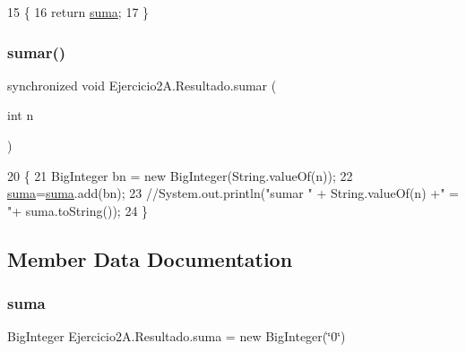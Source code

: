 \begin{DoxyCode}
15     \{
16         \textcolor{keywordflow}{return} \mbox{\hyperlink{class_ejercicio2_a_1_1_resultado_ad684a9a7e4f55ef6862c6d1234259866}{suma}};
17     \}
\end{DoxyCode}
\mbox{\label{class_ejercicio2_a_1_1_resultado_a72ea26b269e45dcf10697761fd351d76}} 
\subsubsection{\texorpdfstring{sumar()}{sumar()}}
{\footnotesize\ttfamily synchronized void Ejercicio2\+A.\+Resultado.\+sumar (\begin{DoxyParamCaption}\item[{int}]{n }\end{DoxyParamCaption})\hspace{0.3cm}{\ttfamily [inline]}}


\begin{DoxyCode}
20     \{
21         BigInteger bn = \textcolor{keyword}{new} BigInteger(String.valueOf(n));
22         \mbox{\hyperlink{namespacesuma}{suma}}=\mbox{\hyperlink{namespacesuma}{suma}}.add(bn);
23         \textcolor{comment}{//System.out.println("sumar " + String.valueOf(n) +" = "+ suma.toString());}
24     \}
\end{DoxyCode}


\subsection{Member Data Documentation}
\mbox{\label{class_ejercicio2_a_1_1_resultado_ad684a9a7e4f55ef6862c6d1234259866}} 
\subsubsection{\texorpdfstring{suma}{suma}}
{\footnotesize\ttfamily Big\+Integer Ejercicio2\+A.\+Resultado.\+suma = new Big\+Integer(\char`\"{}0\char`\"{})\hspace{0.3cm}{\ttfamily [private]}}

